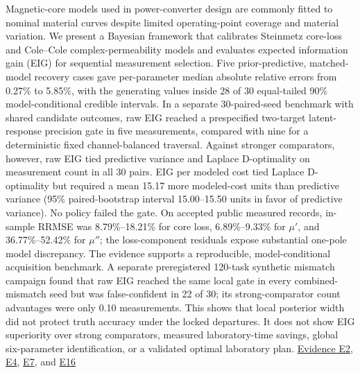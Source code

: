 Magnetic-core models used in power-converter design are commonly fitted
to nominal material curves despite limited operating-point coverage and
material variation. We present a Bayesian framework that calibrates
Steinmetz core-loss and Cole--Cole complex-permeability models and
evaluates expected information gain (EIG) for sequential measurement
selection. Five prior-predictive, matched-model recovery cases gave
per-parameter median absolute relative errors from 0.27\% to 5.85\%,
with the generating values inside 28 of 30 equal-tailed 90\%
model-conditional credible intervals. In a separate 30-paired-seed
benchmark with shared candidate outcomes, raw EIG reached a prespecified
two-target latent-response precision gate in five measurements, compared
with nine for a deterministic fixed channel-balanced traversal. Against
stronger comparators, however, raw EIG tied predictive variance and
Laplace D-optimality on measurement count in all 30 pairs. EIG per
modeled cost tied Laplace D-optimality but required a mean 15.17 more
modeled-cost units than predictive variance (95\% paired-bootstrap
interval 15.00--15.50 units in favor of predictive variance). No policy
failed the gate. On accepted public measured records, in-sample RRMSE
was 8.79\%--18.21\% for core loss, 6.89\%--9.33\% for \(\mu'\), and
36.77\%--52.42\% for \(\mu''\); the loss-component residuals expose
substantial one-pole model discrepancy. The evidence supports a
reproducible, model-conditional acquisition benchmark. A separate
preregistered 120-task synthetic mismatch campaign found that raw EIG
reached the same local gate in every combined-mismatch seed but was
false-confident in 22 of 30; its strong-comparator count advantages were
only 0.10 measurements. This shows that local posterior width did not
protect truth accuracy under the locked departures. It does not show EIG
superiority over strong comparators, measured laboratory-time savings,
global six-parameter identification, or a validated optimal laboratory
plan.
\href{https://github.com/hoangduong6210/EIG-bayesian-for-Recover-potential-Physical-Parameter-of-MagComponent/blob/a3e6326621d90123e5661c17e2d562fb0f5e0a41/wiki/evidence/Evidence-Sources.md\#e2}{Evidence
E2},
\href{https://github.com/hoangduong6210/EIG-bayesian-for-Recover-potential-Physical-Parameter-of-MagComponent/blob/a3e6326621d90123e5661c17e2d562fb0f5e0a41/wiki/evidence/Evidence-Sources.md\#e4}{E4},
\href{https://github.com/hoangduong6210/EIG-bayesian-for-Recover-potential-Physical-Parameter-of-MagComponent/blob/a3e6326621d90123e5661c17e2d562fb0f5e0a41/wiki/evidence/Evidence-Sources.md\#e7}{E7},
and
\href{https://github.com/hoangduong6210/EIG-bayesian-for-Recover-potential-Physical-Parameter-of-MagComponent/blob/a3e6326621d90123e5661c17e2d562fb0f5e0a41/wiki/evidence/Evidence-Sources.md\#e16}{E16}
